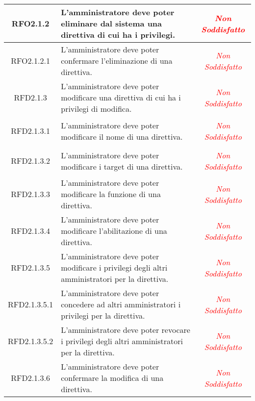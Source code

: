 \begin{longtable}{|c|>{\centering}m{7cm}|c|}
\hypertarget{RFO2.1.2}{RFO2.1.2} & L'amministratore deve poter eliminare dal sistema una direttiva di cui ha i privilegi. & \textcolor{red}{\textit{Non Soddisfatto}}\\ \hline

\hypertarget{RFO2.1.2.1}{RFO2.1.2.1} & L'amministratore deve poter confermare l'eliminazione di una direttiva. & \textcolor{red}{\textit{Non Soddisfatto}}\\ \hline

\hypertarget{RFD2.1.3}{RFD2.1.3} & L'amministratore deve poter modificare una direttiva di cui ha i privilegi di modifica. & \textcolor{red}{\textit{Non Soddisfatto}}\\ \hline

\hypertarget{RFD2.1.3.1}{RFD2.1.3.1} & L'amministratore deve poter modificare il nome di una direttiva. & \textcolor{red}{\textit{Non Soddisfatto}}\\ \hline

\hypertarget{RFD2.1.3.2}{RFD2.1.3.2} & L'amministratore deve poter modificare i target di una direttiva. & \textcolor{red}{\textit{Non Soddisfatto}}\\ \hline

\hypertarget{RFD2.1.3.3}{RFD2.1.3.3} & L'amministratore deve poter modificare la funzione di una direttiva. & \textcolor{red}{\textit{Non Soddisfatto}}\\ \hline

\hypertarget{RFD2.1.3.4}{RFD2.1.3.4} & L'amministratore deve poter modificare l'abilitazione di una direttiva. & \textcolor{red}{\textit{Non Soddisfatto}}\\ \hline

\hypertarget{RFD2.1.3.5}{RFD2.1.3.5} & L'amministratore deve poter modificare i privilegi degli altri amministratori per la direttiva. & \textcolor{red}{\textit{Non Soddisfatto}}\\ \hline

\hypertarget{RFD2.1.3.5.1}{RFD2.1.3.5.1} & L'amministratore deve poter concedere ad altri amministratori i privilegi per la direttiva. & \textcolor{red}{\textit{Non Soddisfatto}}\\ \hline

\hypertarget{RFD2.1.3.5.2}{RFD2.1.3.5.2} & L'amministratore deve poter revocare i privilegi degli altri amministratori per la direttiva. & \textcolor{red}{\textit{Non Soddisfatto}}\\ \hline

\hypertarget{RFD2.1.3.6}{RFD2.1.3.6} & L'amministratore deve poter confermare la modifica di una direttiva. & \textcolor{red}{\textit{Non Soddisfatto}}\\ \hline


\end{longtable}
